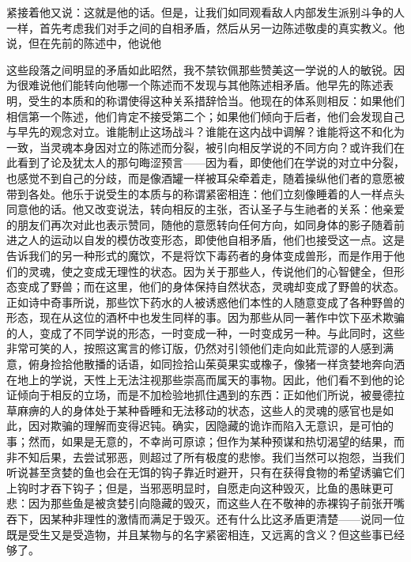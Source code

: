 紧接着他又说：这就是他的话。但是，让我们如同观看敌人内部发生派别斗争的人一样，首先考虑我们对手之间的自相矛盾，然后从另一边陈述敬虔的真实教义。他说，但在先前的陈述中，他说他\par

这些段落之间明显的矛盾如此昭然，我不禁钦佩那些赞美这一学说的人的敏锐。因为很难说他们能转向他哪一个陈述而不发现与其他陈述相矛盾。他早先的陈述表明，受生的本质和的称谓使得这种关系措辞恰当。他现在的体系则相反：如果他们相信第一个陈述，他们肯定不接受第二个；如果他们倾向于后者，他们会发现自己与早先的观念对立。谁能制止这场战斗？谁能在这内战中调解？谁能将这不和化为一致，当灵魂本身因对立的陈述而分裂，被引向相反学说的不同方向？或许我们在此看到了论及犹太人的那句晦涩预言——因为看，即使他们在学说的对立中分裂，也感觉不到自己的分歧，而是像酒罐一样被耳朵牵着走，随着操纵他们者的意愿被带到各处。他乐于说受生的本质与的称谓紧密相连：他们立刻像睡着的人一样点头同意他的话。他又改变说法，转向相反的主张，否认圣子与生祂者的关系：他亲爱的朋友们再次对此也表示赞同，随他的意愿转向任何方向，如同身体的影子随着前进之人的运动以自发的模仿改变形态，即使他自相矛盾，他们也接受这一点。这是告诉我们的另一种形式的魔饮，不是将饮下毒药者的身体变成兽形，而是作用于他们的灵魂，使之变成无理性的状态。因为关于那些人，传说他们的心智健全，但形态变成了野兽；而在这里，他们的身体保持自然状态，灵魂却变成了野兽的状态。正如诗中奇事所说，那些饮下药水的人被诱惑他们本性的人随意变成了各种野兽的形态，现在从这位的酒杯中也发生同样的事。因为那些从同一著作中饮下巫术欺骗的人，变成了不同学说的形态，一时变成一种，一时变成另一种。与此同时，这些非常可笑的人，按照这寓言的修订版，仍然对引领他们走向如此荒谬的人感到满意，俯身捡拾他散播的话语，如同捡拾山茱萸果实或橡子，像猪一样贪婪地奔向洒在地上的学说，天性上无法注视那些崇高而属天的事物。因此，他们看不到他的论证倾向于相反的立场，而是不加检验地抓住遇到的东西：正如他们所说，被曼德拉草麻痹的人的身体处于某种昏睡和无法移动的状态，这些人的灵魂的感官也是如此，因对欺骗的理解而变得迟钝。确实，因隐藏的诡诈而陷入无意识，是可怕的事；然而，如果是无意的，不幸尚可原谅；但作为某种预谋和热切渴望的结果，而非不知后果，去尝试邪恶，则超过了所有极度的悲惨。我们当然可以抱怨，当我们听说甚至贪婪的鱼也会在无饵的钩子靠近时避开，只有在获得食物的希望诱骗它们上钩时才吞下钩子；但是，当邪恶明显时，自愿走向这种毁灭，比鱼的愚昧更可悲：因为那些鱼是被贪婪引向隐藏的毁灭，而这些人在不敬神的赤裸钩子前张开嘴吞下，因某种非理性的激情而满足于毁灭。还有什么比这矛盾更清楚——说同一位既是受生又是受造物，并且某物与的名字紧密相连，又远离的含义？但这些事已经够了。\par

